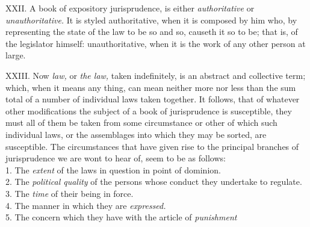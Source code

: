 \documentclass[12pt]{report}
\begin{document}
XXII. A book of expository jurisprudence, is either \emph{authoritative}
or \emph{unauthoritative.} It is styled authoritative, when it is
composed by him who, by representing the state of the law to be so and
so, causeth it so to be; that is, of the legislator himself:
unauthoritative, when it is the work of any other person at large.

XXIII. Now \emph{law,} or \emph{the law,} taken indefinitely, is an
abstract and collective term; which, when it means any thing, can mean
neither more nor less than the sum total of a number of individual laws
taken together. It follows, that of whatever other modifications the
subject of a book of jurisprudence is susceptible, they must all of them
be taken from some circumstance or other of which such individual laws,
or the assemblages into which they may be sorted, are susceptible. The
circumstances that have given rise to the principal branches of
jurisprudence we are wont to hear of, seem to be as follows:\\
1. The \emph{extent} of the laws in question in point of dominion.\\
2. The \emph{political quality} of the persons whose conduct they
undertake to regulate.\\
3. The \emph{time} of their being in force.\\
4. The manner in which they are \emph{expressed.}\\
5. The concern which they have with the article of \emph{punishment}
\end{document}
